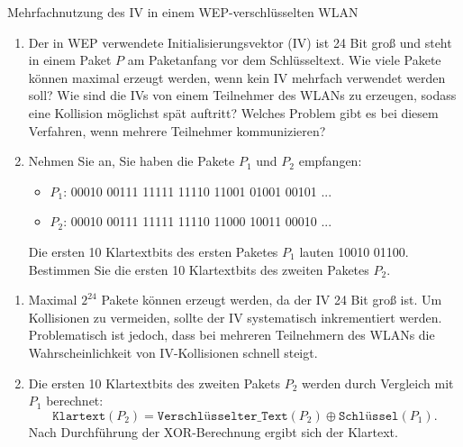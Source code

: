 \documentclass{article}
\begin{document}
\setcounter{subsection}{2228}
\begin{exercise}{Mehrfachnutzung des IV in einem WEP-verschlüsselten WLAN}
  \begin{enumerate}
    \item Der in WEP verwendete Initialisierungsvektor (IV) ist 24 Bit groß und steht in einem Paket $P$ am Paketanfang vor dem Schlüsseltext. Wie viele Pakete können maximal erzeugt werden, wenn kein IV mehrfach verwendet werden soll? Wie sind die IVs von einem Teilnehmer des WLANs zu erzeugen, sodass eine Kollision möglichst spät auftritt? Welches Problem gibt es bei diesem Verfahren, wenn mehrere Teilnehmer kommunizieren?
    \item Nehmen Sie an, Sie haben die Pakete $P_1$ und $P_2$ empfangen:
    \begin{itemize}
      \item $P_1$: 00010 00111 11111 11110 11001 01001 00101 ...
      \item $P_2$: 00010 00111 11111 11110 11000 10011 00010 ...
    \end{itemize}
    Die ersten 10 Klartextbits des ersten Paketes $P_1$ lauten 10010 01100. Bestimmen Sie die ersten 10 Klartextbits des zweiten Paketes $P_2$.
  \end{enumerate}

  \begin{solution}
    \begin{enumerate}
        \item Maximal $ 2^{24} $ Pakete können erzeugt werden, da der IV 24 Bit groß ist. Um Kollisionen zu vermeiden, sollte der IV systematisch inkrementiert werden. Problematisch ist jedoch, dass bei mehreren Teilnehmern des WLANs die Wahrscheinlichkeit von IV-Kollisionen schnell steigt.
        \item Die ersten 10 Klartextbits des zweiten Pakets $ P_2 $ werden durch Vergleich mit $ P_1 $ berechnet:
        \[
        \texttt{Klartext}(P_2) = \texttt{Verschlüsselter\_Text}(P_2) \oplus \texttt{Schlüssel}(P_1).
        \]
        Nach Durchführung der XOR-Berechnung ergibt sich der Klartext.
    \end{enumerate}
  \end{solution}
\end{exercise}



\end{document}
